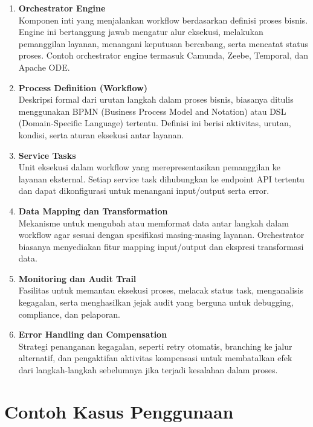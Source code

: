 \begin{enumerate}
	\item \textbf{Orchestrator Engine} \\
	Komponen inti yang menjalankan workflow berdasarkan definisi proses bisnis. Engine ini bertanggung jawab mengatur alur eksekusi, melakukan pemanggilan layanan, menangani keputusan bercabang, serta mencatat status proses. Contoh orchestrator engine termasuk Camunda, Zeebe, Temporal, dan Apache ODE.
	
	\item \textbf{Process Definition (Workflow)} \\
	Deskripsi formal dari urutan langkah dalam proses bisnis, biasanya ditulis menggunakan BPMN (Business Process Model and Notation) atau DSL (Domain-Specific Language) tertentu. Definisi ini berisi aktivitas, urutan, kondisi, serta aturan eksekusi antar layanan.
	
	\item \textbf{Service Tasks} \\
	Unit eksekusi dalam workflow yang merepresentasikan pemanggilan ke layanan eksternal. Setiap service task dihubungkan ke endpoint API tertentu dan dapat dikonfigurasi untuk menangani input/output serta error.
	
	\item \textbf{Data Mapping dan Transformation} \\
	Mekanisme untuk mengubah atau memformat data antar langkah dalam workflow agar sesuai dengan spesifikasi masing-masing layanan. Orchestrator biasanya menyediakan fitur mapping input/output dan ekspresi transformasi data.
	
	\item \textbf{Monitoring dan Audit Trail} \\
	Fasilitas untuk memantau eksekusi proses, melacak status task, menganalisis kegagalan, serta menghasilkan jejak audit yang berguna untuk debugging, compliance, dan pelaporan.
	
	\item \textbf{Error Handling dan Compensation} \\
	Strategi penanganan kegagalan, seperti retry otomatis, branching ke jalur alternatif, dan pengaktifan aktivitas kompensasi untuk membatalkan efek dari langkah-langkah sebelumnya jika terjadi kesalahan dalam proses.
\end{enumerate}


\section{Contoh Kasus Penggunaan}

